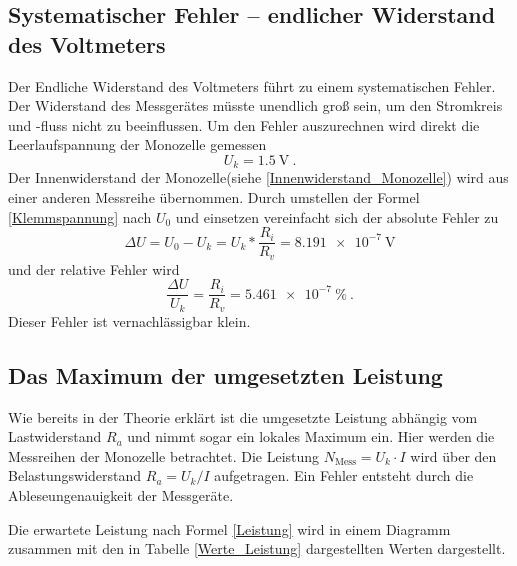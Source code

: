 \subsection{Systematischer Fehler -- endlicher Widerstand des Voltmeters}
Der Endliche Widerstand des Voltmeters führt zu einem systematischen Fehler. Der Widerstand des Messgerätes müsste unendlich groß sein, um den Stromkreis und -fluss nicht zu beeinflussen. Um den Fehler  auszurechnen wird direkt die Leerlaufspannung der Monozelle gemessen
\begin{equation}
U_k = \SI{1.5}{\volt} \ .
\end{equation} 
Der Innenwiderstand der Monozelle(siehe  \eqref{Innenwiderstand_Monozelle}) wird aus einer anderen Messreihe übernommen. Durch umstellen der Formel \eqref{Klemmspannung} nach $U_0$ und einsetzen vereinfacht sich der absolute Fehler zu 
\begin{equation}
\Delta U = U_0 - U_k = U_k * \frac{R_i}{R_v} = \SI{8.191e-7}{\volt}
\end{equation}
und der relative Fehler wird 
\begin{equation}
\frac{\Delta U}{U_k} = \frac{R_i}{R_v} = \SI{5.461e-7}{\%} \ .
\end{equation}
Dieser Fehler ist vernachlässigbar klein.
 
\clearpage 
 
\subsection{Das Maximum der umgesetzten Leistung}
Wie bereits in der Theorie erklärt ist die umgesetzte Leistung abhängig vom Lastwiderstand $R_a$ und nimmt sogar ein lokales Maximum ein. Hier werden die Messreihen der Monozelle betrachtet. Die Leistung $N_\text{Mess} = U_k \cdot I $ wird über den Belastungswiderstand $R_a = U_k / I$ aufgetragen. Ein Fehler entsteht durch die Ableseungenauigkeit der Messgeräte.

\begin{center}

\label{Werte_Leistung}
\end{center}

Die erwartete Leistung nach Formel \eqref{Leistung} wird in einem Diagramm zusammen mit den in Tabelle \ref{Werte_Leistung} dargestellten Werten dargestellt.

